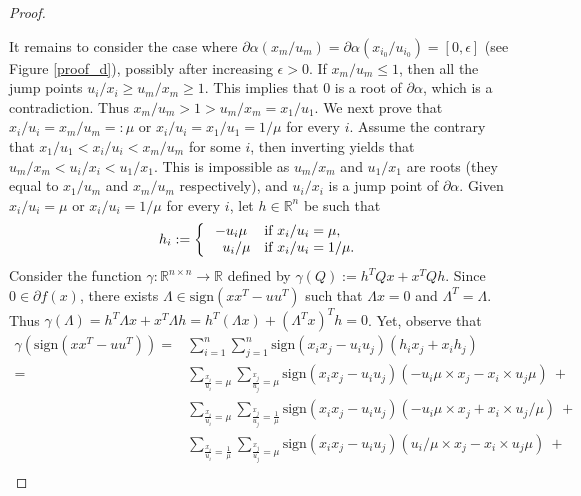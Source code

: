 \documentclass[12pt]{article}
\theoremstyle{definition}
\theoremstyle{plain}
\begin{document}
\begin{proof}
\begin{figure}[ht!]
\end{figure}
It remains to consider the case where $\partial \alpha (x_{m}/u_{m}) =\partial \alpha (x_{i_0}/u_{i_0}) = [0,\epsilon]$ (see Figure \ref{proof_d}), possibly after increasing $\epsilon>0$. If $x_{m}/u_{m}\leqslant 1$, then all the jump points $u_i/x_i \geqslant u_{m}/x_{m} \geqslant 1$. This implies that $0$ is a root of $\partial \alpha$, which is a contradiction. Thus $x_{m}/u_{m}> 1 > u_m/x_m = x_1/u_1$. We next prove that $x_i/u_i = x_m/u_m=:\mu$ or $x_i/u_i = x_1/u_1 = 1/\mu$ for every $i$. Assume the contrary that $x_1/u_1<x_i/u_i<x_m/u_m$ for some $i$, then inverting yields that $u_m/x_m<u_i/x_i<u_1/x_1$. This is impossible as $u_m/x_m$ and $u_1/x_1$ are roots (they equal to $x_1/u_m$ and $x_m/u_m$ respectively), and $u_i/x_i$ is a jump point of $\partial \alpha$.  Given $x_i / u_i = \mu$ or $x_i /u_i = 1/\mu$ for every $i$, let $h \in \mathbb{R}^n$ be such that
\begin{equation}
\label{h}
    h_i := \left\{
    \begin{array}{cl}
        -u_i \mu & \text{if}~ x_i/u_i = \mu, \\
        \hphantom{-}u_i/\mu & \text{if}~ x_i/u_i = 1/\mu.
    \end{array}
    \right.
\end{equation}
Consider the function $\gamma:\mathbb{R}^{n\times n}\rightarrow \mathbb{R}$ defined by $\gamma(Q) := h^T Q x + x^T Q h$. Since $0 \in \partial f(x)$, there exists $\Lambda \in \mathrm{sign}(xx^T-uu^T)$ such that $\Lambda x = 0$ and $\Lambda^T = \Lambda$. Thus $\gamma(\Lambda) = h^T \Lambda x + x^T \Lambda h = h^T (\Lambda x) + (\Lambda^T x)^T h = 0$. Yet, observe that 
\begin{subequations}
        \begin{align}
       \gamma\left(\mathrm{sign}(xx^T-uu^T)\right) = & \sum_{i=1}^n \sum_{j=1}^n \mathrm{sign}(x_ix_j-u_iu_j)(h_ix_j + x_ih_j) \label{gamma-1} ~~~~~~~~~~~~~~~~~ \\
        = & \sum\limits_{\frac{x_i}{u_i} = \mu} \sum\limits_{\frac{x_j}{u_j} = \mu} \mathrm{sign}(x_ix_j-u_iu_j)(-u_i \mu \times x_j - x_i\times u_j \mu) ~ + \label{hb}\\
        & \sum\limits_{\frac{x_i}{u_i} = \mu} \sum\limits_{\frac{x_j}{u_j} = \frac{1}{\mu}} \mathrm{sign}(x_ix_j-u_iu_j)(-u_i \mu \times x_j + x_i \times u_j/\mu) ~ + \label{hc}\\
        & \sum\limits_{\frac{x_i}{u_i} =\frac{1}{\mu}} \sum\limits_{\frac{x_j}{u_j} = \mu} \mathrm{sign}(x_ix_j-u_iu_j)(u_i/\mu \times x_j - x_i \times u_j\mu) ~ + \label{hd}\\

\end{align}
\end{subequations}
\end{proof}
\end{document}
